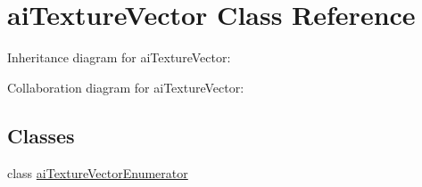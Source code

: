 \hypertarget{classai_texture_vector}{\section{ai\+Texture\+Vector Class Reference}
\label{classai_texture_vector}
}


Inheritance diagram for ai\+Texture\+Vector\+:


Collaboration diagram for ai\+Texture\+Vector\+:
\subsection*{Classes}
\begin{DoxyCompactItemize}
\item 
class \hyperlink{classai_texture_vector_1_1ai_texture_vector_enumerator}{ai\+Texture\+Vector\+Enumerator}
\end{DoxyCompactItemize}

